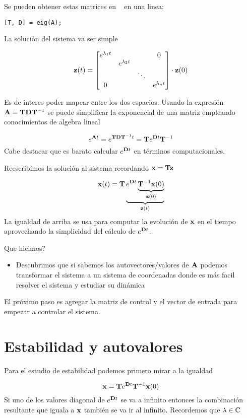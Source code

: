 \documentclass[11pt, a4paper, twoside, openright, openany]{book}
\newcommand{\dimss}{\dimfont{n}}
\begin{document}
Se pueden obtener estas matrices en \Matlab~ en una linea:
\begin{lstlisting}
[T, D] = eig(A);
\end{lstlisting}

La solución del sistema va ser simple

\[
\Cme{z}(t) = \begin{bmatrix}
e^{\lambda_1 t} & & & 0 \\
 &e^{\lambda_2 t}& &  \\
 & &\ddots &  \\
  0& & & e^{\lambda_\dimss t} \\
\end{bmatrix} \cdot \Cme{z}(0)
\]

Es de interes poder mapear entre los dos espacios. Usando la expresión \( \mathbf{A} = \mathbf{T} \mathbf{D} \mathbf{T}^{-1}\) se puede simplificar la exponencial de una matriz empleando conocimientos de algebra lineal

\[
e^{\mathbf{A}t} = e^{\mathbf{T} \mathbf{D} \mathbf{T}^{-1}t} = \mathbf{T} e^{\mathbf{D}t} \mathbf{T}^{-1}
\]
Cabe destacar que es barato calcular \( e^{\mathbf{D}t}\) en términos computacionales. 

Reescribimos la solución al sistema recordando \(\mathbf{x} = \mathbf{T}\mathbf{z}\)

\[
\mathbf{x}(t) = \mathbf{T}  \underbrace{e^{\mathbf{D}t} \underbrace{\mathbf{T}^{-1} \mathbf{x}(0)}_{\mathbf{z}(0)}}_{\mathbf{z}(t)}
\]
La igualdad de arriba se usa para computar la evolución de $\mathbf{x}$ en el tiempo aprovechando la simplicidad del cálculo de \(e^{\mathbf{D}t}\). 

Que hicimos?
\begin{itemize}
	\item Descubrimos que si sabemos los autovectores/valores de \(\mathbf{A}\) podemos transformar el sistema a un sistema de coordenadas donde es más facil resolver el sistema y estudiar su dinámica
\end{itemize}
 
El próximo paso es agregar la matriz de control y el vector de entrada para empezar a controlar el sistema.

\chapter{Estabilidad y autovalores} \label{chap:estabilidadAutovalores}


Para el estudio de estabilidad podemos primero mirar a la igualdad

 \[
\mathbf{x} = \mathbf{T} e^{\mathbf{D}t} \mathbf{T}^{-1} \mathbf{x}(0)
\]
Si uno de los valores diagonal de $e^{\mathbf{D}t}$ se va a infinito entonces la combinación resultante que iguala a \(\mathbf{x}\) también se va ir al infinito. Recordemos que $\lambda \in \Bbb{C}$
\end{document}

